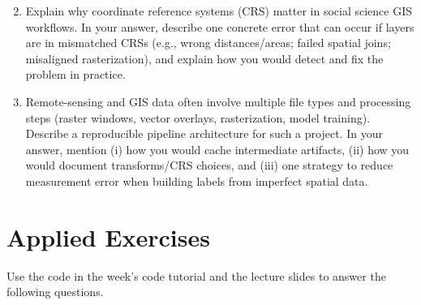 \documentclass[11pt]{article}
\begin{document}
\begin{enumerate}
\setcounter{enumi}{1}

\item Explain why coordinate reference systems (CRS) matter in social science GIS workflows. In your answer, describe one concrete error that can occur if layers are in mismatched CRSs (e.g., wrong distances/areas; failed spatial joins; misaligned rasterization), and explain how you would detect and fix the problem in practice.

\item Remote-sensing and GIS data often involve multiple file types and processing steps (raster windows, vector overlays, rasterization, model training). Describe a reproducible pipeline architecture for such a project. In your answer, mention (i) how you would cache intermediate artifacts, (ii) how you would document transforms/CRS choices, and (iii) one strategy to reduce measurement error when building labels from imperfect spatial data.

  \end{enumerate}


\section*{Applied Exercises}
Use the code in the week's code tutorial and the lecture slides to answer the following questions.\bigskip
\end{document}

